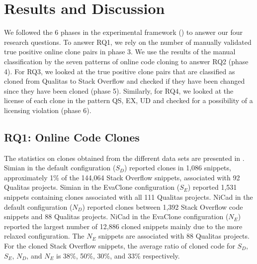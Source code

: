 \documentclass[sigconf,review, anonymous]{acmart}
\newcommand\FIXME[1]{\textbf{FIXME: #1}}
\begin{document}
\section{Results and Discussion}

We followed the 6 phases in the experimental framework ()
to answer our four research questions. 
To answer RQ1, we rely on the number of manually validated true positive online clone pairs
in phase 3. We use the results of the manual classification by the
seven patterns of online code cloning to answer RQ2 (phase 4). 
For RQ3, we looked at the true positive clone pairs that are classified 
as cloned from Qualitas to Stack Overflow and
checked if they have been changed since they have been
cloned (phase 5). Similarly, for RQ4, we looked at the license of each clone in the pattern 
QS, EX, UD and checked for a possibility of a licensing violation (phase 6).

\subsection{RQ1: Online Code Clones} 

The statistics on clones obtained from the different data sets are
presented in . Simian in the default configuration
($S_D$) reported clones in 1,086 snippets, approximately 1\% of the
144,064 Stack Overflow snippets, associated with 92 Qualitas
projects. Simian in the EvaClone configuration ($S_E$) reported 1,531
snippets containing clones associated with all 111 Qualitas
projects. NiCad in the default configuration ($N_D$) reported clones
between 1,392 Stack Overflow code snippets and 88 Qualitas
projects. NiCad in the EvaClone configuration ($N_E$) reported the
largest number of 12,886 cloned snippets mainly due to the more
relaxed configuration. The $N_E$ snippets are associated with 88
Qualitas projects.  For the cloned Stack Overflow snippets, the
average ratio of cloned code for $S_D$, $S_E$, $N_D$, and $N_E$ is
38\%, 50\%, 30\%, and 33\% respectively.

\end{document}
